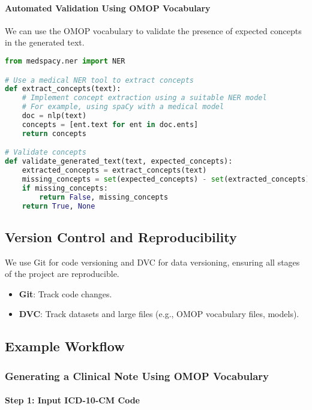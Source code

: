 \documentclass[12pt, a4paper]{article}
\begin{document}
\paragraph{Automated Validation Using OMOP Vocabulary}

We can use the OMOP vocabulary to validate the presence of expected concepts in the generated text.

\begin{lstlisting}[language=Python]
from medspacy.ner import NER

# Use a medical NER tool to extract concepts
def extract_concepts(text):
    # Implement concept extraction using a suitable NER model
    # For example, using spaCy with a medical model
    doc = nlp(text)
    concepts = [ent.text for ent in doc.ents]
    return concepts

# Validate concepts
def validate_generated_text(text, expected_concepts):
    extracted_concepts = extract_concepts(text)
    missing_concepts = set(expected_concepts) - set(extracted_concepts)
    if missing_concepts:
        return False, missing_concepts
    return True, None
\end{lstlisting}

\subsection{Version Control and Reproducibility}

We use Git for code versioning and DVC for data versioning, ensuring all stages of the project are reproducible.

\begin{itemize}
    \item \textbf{Git}: Track code changes.
    \item \textbf{DVC}: Track datasets and large files (e.g., OMOP vocabulary files, models).
\end{itemize}

\subsection{Example Workflow}

\subsubsection{Generating a Clinical Note Using OMOP Vocabulary}

\paragraph{Step 1: Input ICD-10-CM Code}
\end{document}
